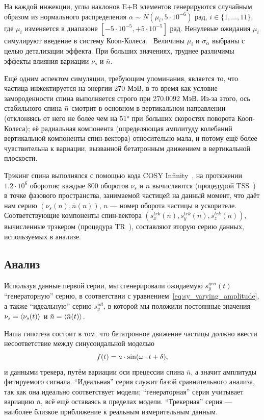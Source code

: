 На каждой инжекции, углы наклонов E+B элементов генерируются случайным образом из
нормального распределения $\alpha\sim N(\mu_i, 5\cdot 10^{-6})$ рад, $i\in\{1,\dots,11\}$, где
$\mu_i$ изменяется в диапазоне $[-5\cdot10^{-5}, +5\cdot10^{-5}]$ рад. Ненулевые ожидания $\mu_i$
симулируют введение в систему Кооп-Колеса.~\cite{Koop:SpinWheel} Величины $\mu_i$ и $\sigma_{\alpha}$
выбраны с целью детализации эффекта. При больших значениях, труднее различимы эффекты влияния вариации
$\nu_s$ и $\bar n$.

Ещё одним аспектом симуляции, требующим упоминания, является то, что частица инжектируется на энергии 270 МэВ, в то время как условие замороденности спина выполняется строго при 270.0092 МэВ. Из-за этого, ось стабильного спина $\bar n$ смотрит в основном в вертикальном направлении (отклоняясь от него не более чем на \ang{51} при больших скоростях поворота Кооп-Колеса); её радиальная компонента (определяющая амплитуду колебаний вертикальной компоненты спин-вектора) относительно мала, и потому ещё более чувствительна к вариации, вызванной бетатронным движением в вертикальной плоскости.

Трэкинг спина выполнялся с помощью кода COSY Infinity~\cite{COSYINF:Website}, на протяжении $1.2\cdot10^6$
оборотов; каждые 800 оборотов $\nu_s$ и $\bar n$ вычисляются (процедурой
TSS~\cite[стр.~41]{COSYINF:BeamPhysMan}) в точке фазового пространства, занимаемой частицей на данный момент,
что даёт нам серию $(\nu_s(n), \bar n(n))$, $n$ --- номер оборота частицы в ускорителе.
Соответствующие компоненты спин-вектора $(s_x^{trk}(n), s_y^{trk}(n), s_z^{trk}(n))$,
вычисленные трэкером (процедура TR~\cite[p.~41]{COSYINF:BeamPhysMan}), составляют вторую серию данных,
используемых в анализе.

\subsection{Анализ}
Используя данные первой серии, мы сгенерировали ожидаемую $s_y^{gen}(t)$ ``генераторную'' серию,
в соответствии с уравнением~\eqref{eq:sy_varying_amplitude}, а также ``идеальную'' серию $s_y^{idl}$, в которой
мы положили постоянные значения $\nu_s = \avg{\nu_s(t)}$ и $\bar n =\avg{\bar n(t)}$. 

Наша гипотеза состоит в том, что бетатронное движение частицы
должно ввести несоответствие между синусоидальной моделью
\begin{equation}
  f(t) = a\cdot\sin(\omega\cdot t + \delta),\label{eq:fit_model}
\end{equation}
и данными трекера, путём вариации оси прецессии спина $\bar n$, а значит амплитуды
фитируемого сигнала. ``Идеальная'' серия служит базой сравнительного анализа,
так как она идеально соответствует модели; ``генераторная'' серия учитывает вариацию $\bar n$,
всё ещё оставаясь в пределах модели. ``Трекерная'' серия --- наиболее близкое приближение
к реальным измерительным данным.

